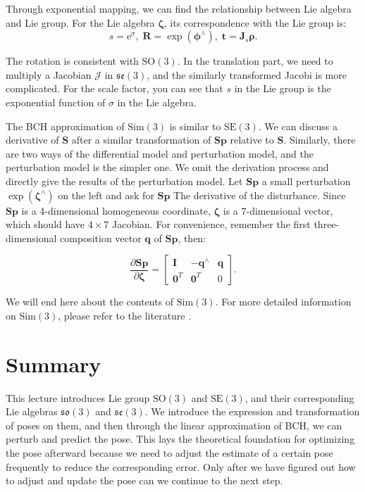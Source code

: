 Through exponential mapping, we can find the relationship between Lie algebra and Lie group. For the Lie algebra $\boldsymbol{\zeta}$, its correspondence with the Lie group is:
\begin{equation}
s=\mathrm{e}^\sigma, \; \mathbf{R} = \exp( \boldsymbol{\phi} ^\wedge), \; \mathbf{t} = \mathbf{J}_s \boldsymbol{ \rho}.
\end{equation}

The rotation is consistent with $\mathrm{SO}(3)$. In the translation part, we need to multiply a Jacobian $\boldsymbol{\mathcal{J}}$ in $\mathfrak{se}(3)$, and the similarly transformed Jacobi is more complicated. For the scale factor, you can see that $s$ in the Lie group is the exponential function of $\sigma$ in the Lie algebra.

The BCH approximation of $\mathrm{Sim}(3)$ is similar to $\mathrm{SE}(3)$. We can discuss a derivative of $\mathbf{S}$ after a similar transformation of $\mathbf{S} \mathbf{p}$ relative to $\mathbf{S}$. Similarly, there are two ways of the differential model and perturbation model, and the perturbation model is the simpler one. We omit the derivation process and directly give the results of the perturbation model. Let $\mathbf{S} \mathbf{p}$ a small perturbation $\exp( \boldsymbol{\zeta} ^\wedge )$ on the left and ask for $\mathbf{S} \mathbf{p}$ The derivative of the disturbance. Since $\mathbf{S} \mathbf{p}$ is a 4-dimensional homogeneous coordinate, $\boldsymbol{\zeta}$ is a 7-dimensional vector, which should have $4 \times 7$ Jacobian. For convenience, remember the first three-dimensional composition vector $\mathbf{q}$ of $\mathbf{Sp}$, then:

\begin{equation}
\frac{{\partial \mathbf{Sp}}}{{\partial \boldsymbol{\zeta} }} = \left[ {\begin{array}{*{20}{c}}
    \mathbf{I} &{ - {\mathbf{q}^ \wedge }}& \mathbf{q} \\
    {{\mathbf{0}^T}} & {{ \mathbf{0}^T}}&0
    \end{array}} \right].
\end{equation}

We will end here about the contents of $\mathrm{Sim}(3)$. For more detailed information on $\mathrm{Sim}(3)$, please refer to the literature \cite{Strasdat2012a}.

\section{Summary}
This lecture introduces Lie group $\mathrm{SO}(3)$ and $\mathrm{SE}(3)$, and their corresponding Lie algebras $\mathfrak{so}(3)$ and $\mathfrak{se }(3)$. We introduce the expression and transformation of poses on them, and then through the linear approximation of BCH, we can perturb and predict the pose. This lays the theoretical foundation for optimizing the pose afterward because we need to adjust the estimate of a certain pose frequently to reduce the corresponding error. Only after we have figured out how to adjust and update the pose can we continue to the next step.


